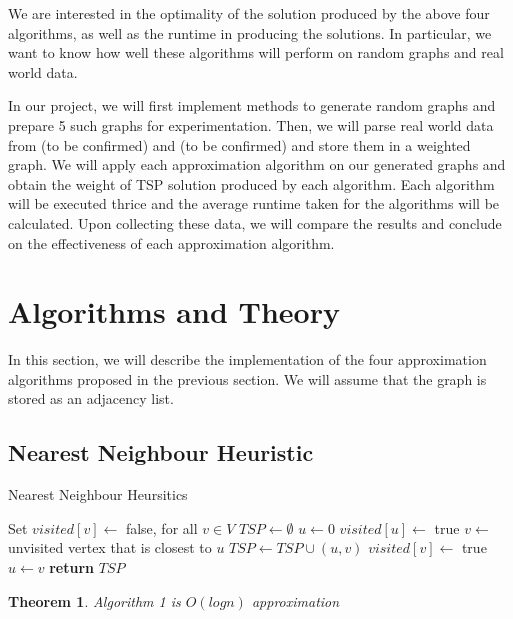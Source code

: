 \documentclass[paper=a4, fontsize=11pt]{scrartcl}	%
\numberwithin{equation}{section}		%
\numberwithin{figure}{section}			%
\numberwithin{table}{section}				%
\newtheorem{theorem}{Theorem}
\begin{document}
We are interested in the optimality of the solution produced by the above four algorithms, as well as the runtime in producing the solutions. In particular, we want to know how well these algorithms will perform on random graphs and real world data. 

In our project, we will first implement methods to generate random graphs and prepare 5 such graphs for experimentation. Then, we will parse real world data from (to be confirmed) and (to be confirmed) and store them in a weighted graph. We will apply each approximation algorithm on our generated graphs and obtain the weight of TSP solution produced by each algorithm. Each algorithm will be executed thrice and the average runtime taken for the algorithms will be calculated. Upon collecting these data, we will compare the results and conclude on the effectiveness of each approximation algorithm.

\section{Algorithms and Theory}

In this section, we will describe the implementation of the four approximation algorithms proposed in the previous section. We will assume that the graph is stored as an adjacency list. 

\subsection{Nearest Neighbour Heuristic}
\begin{algorithm}
\caption{Nearest Neighbour Heursitics}\label{neighbour}
\begin{algorithmic}[1]
   \State Set $visited[v]\gets$ false, for all $v\in V$
   \State $TSP\gets\emptyset$
   \State $u\gets 0$
   \State $visited[u]\gets$ true
      \State $v\gets$ unvisited vertex that is closest to $u$
      \State $TSP\gets TSP\cup(u,v)$
      \State $visited[v]\gets$ true
      \State $u\gets v$
   \EndWhile\label{nearestneighbourwhile}
   \State \textbf{return} $TSP$
\EndProcedure
\end{algorithmic}
\end{algorithm}

\begin{theorem}
Algorithm 1 is $O(log n)$ approximation
\end{theorem}
\end{document}
